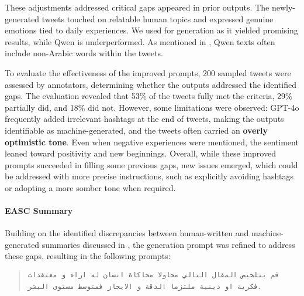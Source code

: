 These adjustments addressed critical gaps appeared in prior outputs. The newly-generated tweets touched on relatable human topics and expressed genuine emotions tied to daily experiences. We used \gptfouro for generation as it yielded promising results, while Qwen is underperformed. As mentioned in , Qwen texts often include non-Arabic words within the tweets. 

To evaluate the effectiveness of the improved prompts, 200 sampled tweets were assessed by annotators, determining whether the outputs addressed the identified gaps. The evaluation revealed that 53\% of the tweets fully met the criteria, 29\% partially did, and 18\% did not. However, some limitations were observed: GPT-4o frequently added irrelevant hashtags at the end of tweets, making the outputs identifiable as machine-generated, and the tweets often carried an \textbf{overly optimistic tone}. Even when negative experiences were mentioned, the sentiment leaned toward positivity and new beginnings. 
Overall, while these improved prompts succeeded in filling some previous gaps, new issues emerged, which could be addressed with more precise instructions, such as explicitly avoiding hashtags or adopting a more somber tone when required.


\paragraph{EASC Summary}
Building on the identified discrepancies between human-written and machine-generated summaries discussed in , the generation prompt was refined to address these gaps, resulting in the following prompts:
\begin{quote}
    \small
    \begin{RLtext}
            \texttt{قم بتلخيص المقال التالي محاولا محاكاة انسان له اراء و معتقدات فكرية او دينية ملتزما الدقة و الايجاز فمتوسط مستوى البشر}.
    \end{RLtext}
\end{quote} 

